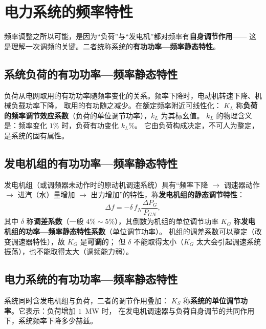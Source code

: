 \section{电力系统的频率特性}

频率调整之所以可能，是因为“负荷”与“发电机”都对频率有\textbf{自身调节作用}——
这是理解一次调频的关键。二者统称系统的\textbf{有功功率—频率静态特性}。

\subsection{系统负荷的有功功率—频率静态特性}

负荷从电网取用的有功功率随频率变化的关系。频率下降时，电动机转速下降、机械负载功率下降，
取用的有功随之减少。在额定频率附近可线性化：
$K_L$ 称\textbf{负荷的频率调节效应系数}（负荷的单位调节功率），$k_L$ 为其标幺值。
$k_L$ 的物理含义是：频率变化 $1\%$ 时，负荷有功变化 $k_L\%$。
它由负荷构成决定，不可人为整定，是系统的固有属性。

\subsection{发电机组的有功功率—频率静态特性}

发电机组（或调频器未动作时的原动机调速系统）具有“频率下降 $\to$ 调速器动作 $\to$
进汽（水）量增加 $\to$ 出力增加”的特性，称\textbf{发电机组的静态调节特性}：
\begin{equation}
  \Delta f=-\delta\,f_N\frac{\Delta P_G}{P_{GN}},
\end{equation}
其中 $\delta$ 称\textbf{调差系数}（一般 $4\%\sim5\%$），其倒数为机组的单位调节功率
$K_G$ 称\textbf{发电机组的功率—频率静态特性系数}（单位调节功率）。
机组的调差系数可以整定（改变调速器特性），故 $K_G$ 是\textbf{可调}的；
但 $\delta$ 不能取得太小（$K_G$ 太大会引起调速系统振荡），也不能取得太大（调频能力弱）。

\subsection{电力系统的有功功率—频率静态特性}

系统同时含发电机组与负荷，二者的调节作用叠加：
$K_S$ 称\textbf{系统的单位调节功率}。它表示：负荷增加 $1$~MW 时，
在发电机调速器与负荷自身调节的共同作用下，系统频率下降多少赫兹。

